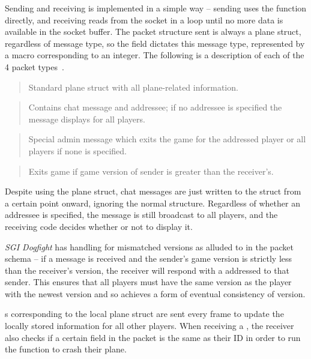 Sending and receiving is implemented in a simple way -- sending uses the  function directly, and receiving reads from the socket in a loop until no more data is available in the socket buffer.
The packet structure sent is always a plane struct, regardless of message type, so the  field dictates this message type, represented by a macro corresponding to an integer. The following is a description of each of the 4 packet types~\cite{dogsrc}.

\begin{quote}

  Standard plane struct with all plane-related information.
\end{quote}

\begin{quote}

  Contains chat message and addressee; if no addressee is specified the message displays for all players.
\end{quote}

\begin{quote}

  Special admin message which exits the game for the addressed player or all players if none is specified.
\end{quote}

\begin{quote}

  Exits game if game version of sender is greater than the receiver's.
\end{quote}

Despite using the plane struct, chat messages are just written to the struct from a certain point onward, ignoring the normal structure. Regardless of whether an addressee is specified, the message is still broadcast to all players, and the receiving code decides whether or not to display it.

\textit{SGI Dogfight} has handling for mismatched versions as alluded to in the packet schema -- if a message is received and the sender's game version is strictly less than the receiver's version, the receiver will respond with a  addressed to that sender. This ensures that all players must have the same version as the player with the newest version and so achieves a form of eventual consistency of version.

s corresponding to the local plane struct are sent every frame to update the locally stored information for all other players. When receiving a , the receiver also checks if a certain field in the packet is the same as their ID in order to run the function to crash their plane.

